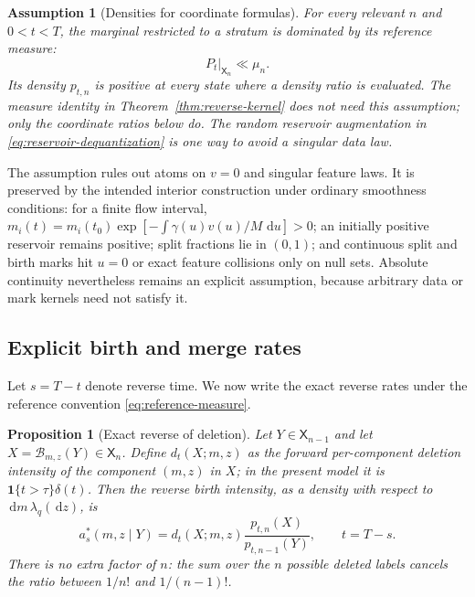 \documentclass[10pt]{article}
\newtheorem{proposition}[theorem]{Proposition}
\newtheorem{assumption}[theorem]{Assumption}
\theoremstyle{definition}
\theoremstyle{remark}
\newcommand{\dd}{\,\mathrm{d}}
\newcommand{\ind}{\mathbf{1}}
\newcommand{\state}{\mathsf{X}}
\newcommand{\birthmap}{\mathcal{B}}
\begin{document}
\begin{assumption}[Densities for coordinate formulas]
\label{ass:stratum-densities}
For every relevant $n$ and $0<t<T$, the marginal restricted to a stratum is
dominated by its reference measure:
\begin{equation}
  P_t|_{\state_n}\ll\mu_n.
\end{equation}
Its density $p_{t,n}$ is positive at every state where a density ratio is
evaluated.  The measure identity in Theorem~\ref{thm:reverse-kernel} does not
need this assumption; only the coordinate ratios below do.  The random
reservoir augmentation in \eqref{eq:reservoir-dequantization} is one way to
avoid a singular data law.
\end{assumption}

The assumption rules out atoms on $v=0$ and singular feature laws.  It is
preserved by the intended interior construction under ordinary smoothness
conditions: for a finite flow interval,
$m_i(t)=m_i(t_0)\exp[-\int\gamma(u)v(u)/M\,\dd u]>0$; an initially positive
reservoir remains positive; split fractions lie in $(0,1)$; and continuous
split and birth marks hit $u=0$ or exact feature collisions only on null
sets.  Absolute continuity nevertheless remains an explicit assumption,
because arbitrary data or mark kernels need not satisfy it.

\subsection{Explicit birth and merge rates}

Let $s=T-t$ denote reverse time.  We now write the exact reverse rates under the reference convention \eqref{eq:reference-measure}.

\begin{proposition}[Exact reverse of deletion]
\label{prop:reverse-death}
Let $Y\in\state_{n-1}$ and let $X=\birthmap_{m,z}(Y)\in\state_n$.  Define
$d_t(X;m,z)$ as the forward per-component deletion intensity of the
component $(m,z)$ in $X$; in the present model it is
$\ind\{t>\tau\}\delta(t)$.  Then the reverse birth intensity, as a density
with respect to $\dd m\,\lambda_q(\dd z)$, is
\begin{equation}
  a_s^*(m,z\mid Y)
  =d_t(X;m,z)\frac{p_{t,n}(X)}{p_{t,n-1}(Y)},
  \qquad t=T-s.
  \label{eq:exact-birth-rate}
\end{equation}
There is no extra factor of $n$: the sum over the $n$ possible deleted labels cancels the ratio between $1/n!$ and $1/(n-1)!$.
\end{proposition}
\end{document}
